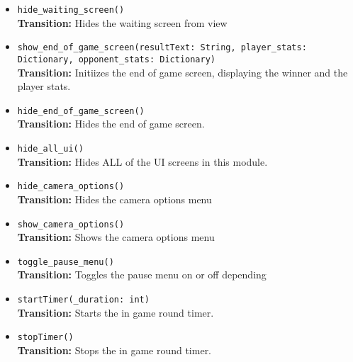 \documentclass[12pt, titlepage]{article}
\begin{document}
\begin{itemize}
	\item \texttt{hide\_waiting\_screen() } \\
	\textbf{Transition:} Hides the waiting screen from view
	
	\item \texttt{show\_end\_of\_game\_screen(resultText: String, player\_stats: Dictionary, opponent\_stats: Dictionary) } \\
	\textbf{Transition:} Initiizes the end of game screen, displaying the winner and the player stats.
	
	\item \texttt{hide\_end\_of\_game\_screen() } \\
	\textbf{Transition:} Hides the end of game screen.
	
	\item \texttt{hide\_all\_ui() } \\
	\textbf{Transition:} Hides ALL of the UI screens in this module.
	
	\item \texttt{hide\_camera\_options()  }\\
	\textbf{Transition:} Hides the camera options menu
	
	\item \texttt{show\_camera\_options()  }\\
	\textbf{Transition:} Shows the camera options menu
	
	\item \texttt{toggle\_pause\_menu() }\\
	\textbf{Transition:} Toggles the pause menu on or off depending 
	
	\item \texttt{startTimer(\_duration: int)  }\\
	\textbf{Transition:} Starts the in game round timer.
	
	\item \texttt{stopTimer() }\\
	\textbf{Transition:} Stops the in game round timer.
	

\end{itemize}
\end{document}

